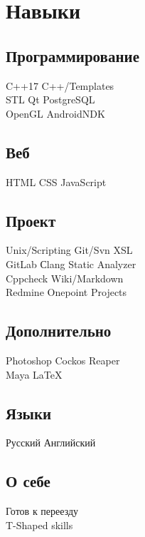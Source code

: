 \documentclass[a4paper]{curricula-vitae}
\begin{document}
\begin{minipage}[t]{0.33\textwidth}
\insertspace

\section{Навыки}

\subsection{Программирование}
C++17 \textbullet{} C++/Templates \\
STL \textbullet{} Qt \textbullet{} PostgreSQL \\
OpenGL \textbullet{} AndroidNDK


\insertspace

\subsection{Веб}
HTML \textbullet{} CSS \textbullet{} JavaScript

\insertspace

\subsection{Проект}
Unix/Scripting \textbullet{} Git/Svn \textbullet{} XSL \\
GitLab \textbullet{} Сlang Static Analyzer \\
Cppcheck \textbullet{} Wiki/Markdown \\
Redmine \textbullet{} Onepoint Projects


\insertspace

\subsection{Дополнительно}
Photoshop \textbullet{} Cockos Reaper \\
Maya \textbullet{} \LaTeX

\insertspace

\subsection{Языки}
Русский \textbullet{} Английский

\insertspace

\subsection{О себе}
Готов к переезду \\
T-Shaped skills

\insertspace
\insertspace



\end{minipage}%
\end{document}
